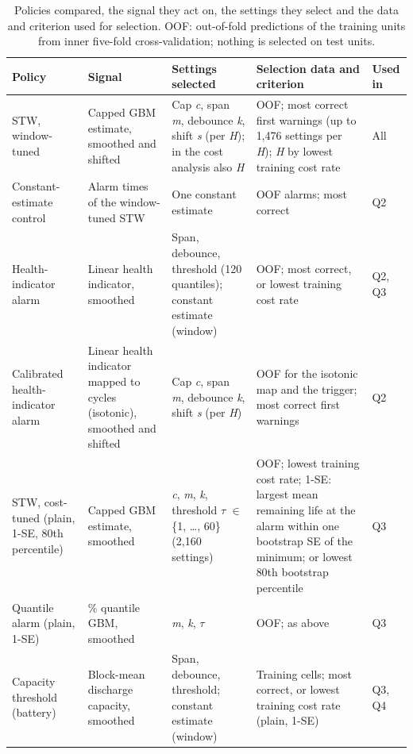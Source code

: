 \documentclass[a4paper,fleqn,doubleblind]{cas-dc}
\begin{document}
\begin{table}[!tbp]
\footnotesize\setlength{\tabcolsep}{4pt}
\caption{Policies compared, the signal they act on, the settings they select and the data and criterion used for selection. OOF: out-of-fold predictions of the training units from inner five-fold cross-validation; nothing is selected on test units.}
\begin{tabular}{@{}>{\raggedright\arraybackslash}p{}>{\raggedright\arraybackslash}p{}>{\raggedright\arraybackslash}p{}>{\raggedright\arraybackslash}p{}>{\raggedright\arraybackslash}p{}@{}}
\toprule
Policy & Signal & Settings selected & Selection data and criterion & Used in \\
\midrule
STW, window-tuned & Capped GBM estimate, smoothed and shifted & Cap \textit{c}, span \textit{m}, debounce \textit{k}, shift \textit{s} (per \textit{H}); in the cost analysis also \textit{H} & OOF; most correct first warnings (up to 1,476 settings per \textit{H}); \textit{H} by lowest training cost rate & All \\
Constant-estimate control & Alarm times of the window-tuned STW & One constant estimate & OOF alarms; most correct & Q2 \\
Health-indicator alarm & Linear health indicator, smoothed & Span, debounce, threshold (120 quantiles); constant estimate (window)  & OOF; most correct, or lowest training cost rate & Q2, Q3 \\
Calibrated health-indicator alarm & Linear health indicator mapped to cycles (isotonic), smoothed and shifted & Cap \textit{c}, span \textit{m}, debounce \textit{k}, shift \textit{s} (per \textit{H}) & OOF for the isotonic map and the trigger; most correct first warnings & Q2 \\
STW, cost-tuned (plain, 1-SE, 80th percentile) & Capped GBM estimate, smoothed & \textit{c}, \textit{m}, \textit{k}, threshold $\tau$ $\in$ \{1, \ldots{}, 60\} (2,160 settings) & OOF; lowest training cost rate; 1-SE: largest mean remaining life at the alarm within one bootstrap SE of the minimum; or lowest 80th bootstrap percentile & Q3 \\
Quantile alarm (plain, 1-SE) & 10\% quantile GBM, smoothed & \textit{m}, \textit{k}, $\tau$ & OOF; as above & Q3 \\
Capacity threshold (battery) & Block-mean discharge capacity, smoothed & Span, debounce, threshold; constant estimate (window) & Training cells; most correct, or lowest training cost rate (plain, 1-SE) & Q3, Q4 \\

\end{tabular}
\end{table}
\end{document}
